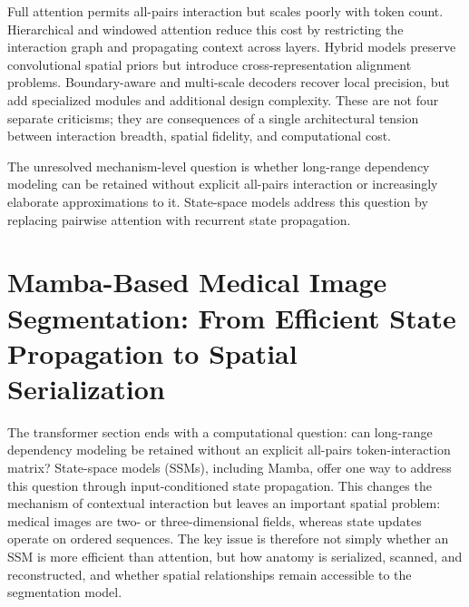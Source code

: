 \documentclass[5p,times,authoryear]{elsarticle}
\begin{document}
Full attention permits all-pairs interaction but scales poorly with token count. Hierarchical and windowed attention reduce this cost by restricting the interaction graph and propagating context across layers. Hybrid models preserve convolutional spatial priors but introduce cross-representation alignment problems. Boundary-aware and multi-scale decoders recover local precision, but add specialized modules and additional design complexity. These are not four separate criticisms; they are consequences of a single architectural tension between interaction breadth, spatial fidelity, and computational cost.

The unresolved mechanism-level question is whether long-range dependency modeling can be retained without explicit all-pairs interaction or increasingly elaborate approximations to it. State-space models address this question by replacing pairwise attention with recurrent state propagation.


\section{Mamba-Based Medical Image Segmentation: From Efficient State Propagation to Spatial Serialization}
\label{sec:mamba_review}


The transformer section ends with a computational question: can long-range dependency modeling be retained without an explicit all-pairs token-interaction matrix? State-space models (SSMs), including Mamba, offer one way to address this question through input-conditioned state propagation. This changes the mechanism of contextual interaction but leaves an important spatial problem: medical images are two- or three-dimensional fields, whereas state updates operate on ordered sequences. The key issue is therefore not simply whether an SSM is more efficient than attention, but how anatomy is serialized, scanned, and reconstructed, and whether spatial relationships remain accessible to the segmentation model.
\end{document}
